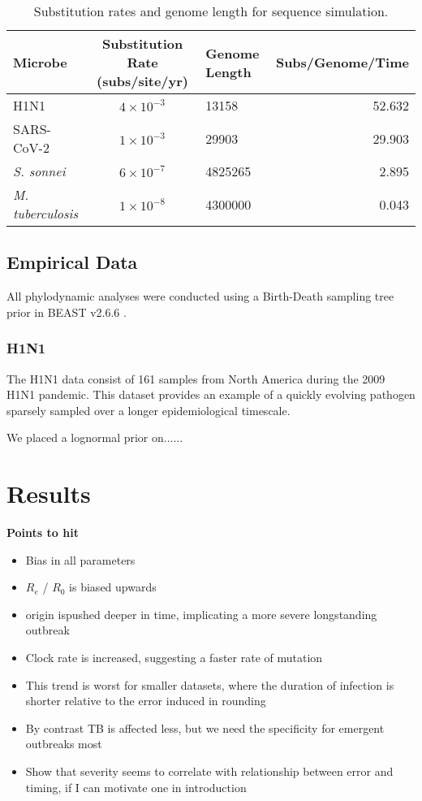 \documentclass{article}
\begin{document}
\begin{spacing}{1.5}
\begin{table}[ht]
    \centering
    \caption{Substitution rates and genome length for sequence simulation.}
    \begin{tabular}{l|c|l|r}
    \hline
    Microbe                     &   Substitution Rate (subs/site/yr) & Genome Length & Subs/Genome/Time  \\
    \hline
    H1N1                        & $4\times10^{-3}$ & 13158 & 52.632\\
    SARS-CoV-2                  & $1\times10^{-3}$ & 29903 & 29.903\\
    \textit{S. sonnei}    & $6\times10^{-7}$ & 4825265  & 2.895\\
    \textit{M. tuberculosis}    &   $1\times10^{-8}$ & 4300000 & 0.043\\
    \hline
    \end{tabular}
    \label{tab:seq_parms}
\end{table}

\subsection*{Empirical Data}
All phylodynamic analyses were conducted using a Birth-Death sampling tree prior in BEAST v2.6.6 \citep{bouckaert_beast_2019}. 

\subsubsection*{H1N1}
The H1N1 data consist of 161 samples from North America during the 2009 H1N1 pandemic. This  dataset provides an example of a quickly evolving pathogen sparsely sampled over a longer epidemiological timescale. 

We placed a lognormal prior on......

\section*{Results}
\textbf{Points to hit}
\begin{itemize}
    \item Bias in all parameters
    \item $R_e$ / $R_0$ is biased upwards
    \item origin ispushed deeper in time, implicating a more severe longstanding outbreak
    \item Clock rate is increased, suggesting a faster rate of mutation
    \item This trend is worst for smaller datasets, where the duration of infection is shorter relative to the error induced in rounding
    \item By contrast TB is affected less, but we need the specificity for emergent outbreaks most
    \item Show that severity seems to correlate with relationship between error and timing, if I can motivate one in introduction
\end{itemize}


\end{spacing}
\end{document}
